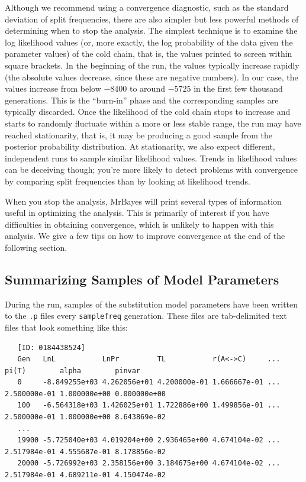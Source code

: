 \documentclass[12pt]{book}
\newcommand{\ttt}[1]{\texttt{#1} }
\begin{document}
Although we recommend using a convergence diagnostic, such as the standard deviation of split
frequencies, there are also simpler but less powerful methods of determining when to stop the
analysis. The simplest technique is to examine the log likelihood values (or, more exactly, the log
probability of the data given the parameter values) of the cold chain, that is, the values printed
to screen within square brackets. In the beginning of the run, the values typically increase
rapidly (the absolute values decrease, since these are negative numbers). In our case, the values
increase from below $-8400$ to around $-5725$ in the first few thousand generations. This is the
``burn-in'' phase and the corresponding samples are typically discarded.  Once the likelihood of the
cold chain stops to increase and starts to randomly fluctuate within a more or less stable range,
the run may have reached stationarity, that is, it may be producing a good sample from the
posterior probability distribution. At stationarity, we also expect different, independent runs to
sample similar likelihood values. Trends in likelihood values can be deceiving though; you're more
likely to detect problems with convergence by comparing split frequencies than by looking at
likelihood trends.

When you stop the analysis, MrBayes will print several types of information useful in optimizing
the analysis. This is primarily of interest if you have difficulties in obtaining convergence,
which is unlikely to happen with this analysis. We give a few tips on how to improve convergence at
the end of the following section.

\subsection{Summarizing Samples of Model Parameters}

During the run, samples of the substitution model parameters have been written to the \ttt{.p}
files every \ttt{samplefreq} generation. These files are tab-delimited text files that look
something like this: 

\begin{singlespacing}
\scriptsize
\begin{verbatim}
   [ID: 0184438524]
   Gen   LnL           LnPr         TL           r(A<->C)     ... pi(T)        alpha        pinvar
   0     -8.849255e+03 4.262056e+01 4.200000e-01 1.666667e-01 ... 2.500000e-01 1.000000e+00 0.000000e+00
   100   -6.564318e+03 1.426025e+01 1.722886e+00 1.499856e-01 ... 2.500000e-01 1.000000e+00 8.643869e-02
   ...
   19900 -5.725040e+03 4.019204e+00 2.936465e+00 4.674104e-02 ... 2.517984e-01 4.555687e-01 8.178856e-02
   20000 -5.726992e+03 2.358156e+00 3.184675e+00 4.674104e-02 ... 2.517984e-01 4.689211e-01 4.150474e-02
\end{verbatim}
\normalsize
\end{singlespacing}
\end{document}
